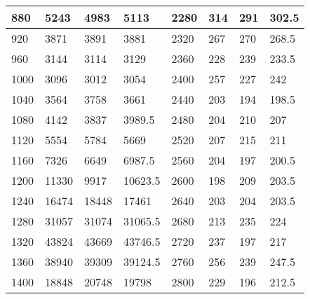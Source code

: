 \begin{table}[!ht]
\begin{tabular}{|l|l|l|l||l|l|l|l|}
        880 & 5243 & 4983 & 5113 & 2280 & 314 & 291 & 302.5 \\ \hline
        920 & 3871 & 3891 & 3881 & 2320 & 267 & 270 & 268.5 \\ \hline
        960 & 3144 & 3114 & 3129 & 2360 & 228 & 239 & 233.5 \\ \hline
        1000 & 3096 & 3012 & 3054 & 2400 & 257 & 227 & 242 \\ \hline
        1040 & 3564 & 3758 & 3661 & 2440 & 203 & 194 & 198.5 \\ \hline
        1080 & 4142 & 3837 & 3989.5 & 2480 & 204 & 210 & 207 \\ \hline
        1120 & 5554 & 5784 & 5669 & 2520 & 207 & 215 & 211 \\ \hline
        1160 & 7326 & 6649 & 6987.5 & 2560 & 204 & 197 & 200.5 \\ \hline
        1200 & 11330 & 9917 & 10623.5 & 2600 & 198 & 209 & 203.5 \\ \hline
        1240 & 16474 & 18448 & 17461 & 2640 & 203 & 204 & 203.5 \\ \hline
        1280 & 31057 & 31074 & 31065.5 & 2680 & 213 & 235 & 224 \\ \hline
        1320 & 43824 & 43669 & 43746.5 & 2720 & 237 & 197 & 217 \\ \hline
        1360 & 38940 & 39309 & 39124.5 & 2760 & 256 & 239 & 247.5 \\ \hline
        1400 & 18848 & 20748 & 19798 & 2800 & 229 & 196 & 212.5 \\ \hline
    \end{tabular}



\end{table}